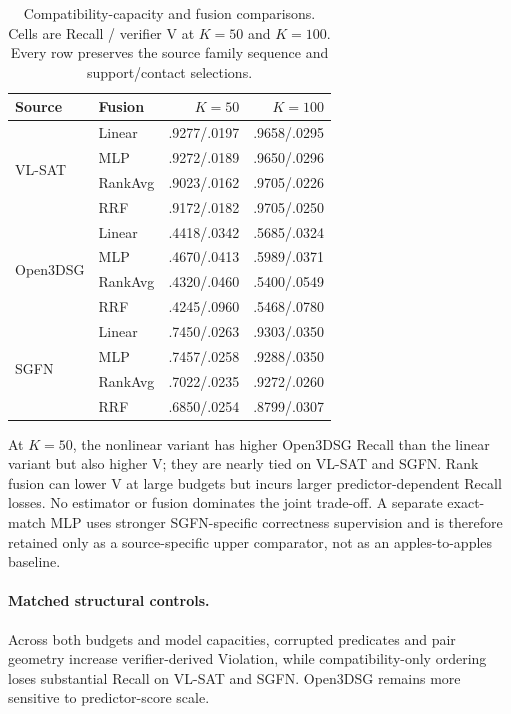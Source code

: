 \begin{table}[t]
\centering
{\small
\setlength{\tabcolsep}{3pt}
\begin{tabular}{llrr}
\toprule
Source & Fusion & $K=50$ & $K=100$ \\
\midrule
\multirow{4}{*}{VL-SAT}
 & Linear & .9277/.0197 & .9658/.0295 \\
 & MLP & .9272/.0189 & .9650/.0296 \\
 & RankAvg & .9023/.0162 & .9705/.0226 \\
 & RRF & .9172/.0182 & .9705/.0250 \\
\midrule
\multirow{4}{*}{Open3DSG}
 & Linear & .4418/.0342 & .5685/.0324 \\
 & MLP & .4670/.0413 & .5989/.0371 \\
 & RankAvg & .4320/.0460 & .5400/.0549 \\
 & RRF & .4245/.0960 & .5468/.0780 \\
\midrule
\multirow{4}{*}{SGFN}
 & Linear & .7450/.0263 & .9303/.0350 \\
 & MLP & .7457/.0258 & .9288/.0350 \\
 & RankAvg & .7022/.0235 & .9272/.0260 \\
 & RRF & .6850/.0254 & .8799/.0307 \\
\bottomrule
\end{tabular}
}
\caption{Compatibility-capacity and fusion comparisons. Cells are Recall /
verifier V at $K=50$ and $K=100$. Every row preserves the source family
sequence and support/contact selections.}
\label{tab:nonlinear-comparison}
\end{table}

At $K=50$, the nonlinear variant has higher Open3DSG Recall than the linear
variant but also higher V; they are nearly tied on VL-SAT and SGFN. Rank fusion can
lower V at large budgets but incurs larger predictor-dependent Recall losses.
No estimator or fusion dominates the joint trade-off. A separate exact-match MLP uses
stronger SGFN-specific correctness supervision and is therefore retained only
as a source-specific upper comparator, not as an apples-to-apples baseline.

\paragraph{Matched structural controls.}


Across both budgets and model capacities, corrupted predicates and pair
geometry increase verifier-derived Violation, while compatibility-only
ordering loses substantial Recall on VL-SAT and SGFN. Open3DSG remains more
sensitive to predictor-score scale.

